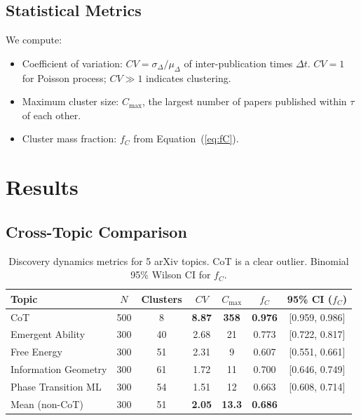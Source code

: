 \documentclass[12pt]{article}
\begin{document}
\subsection{Statistical Metrics}

We compute:
\begin{itemize}
    \item Coefficient of variation: $CV = \sigma_\Delta / \mu_\Delta$ of inter-publication times $\Delta t$. $CV = 1$ for Poisson process; $CV \gg 1$ indicates clustering.
    \item Maximum cluster size: $C_{\max}$, the largest number of papers published within $\tau$ of each other.
    \item Cluster mass fraction: $f_C$ from Equation~(\ref{eq:fC}).
\end{itemize}

\section{Results}

\subsection{Cross-Topic Comparison}

\begin{table}[htbp]
  \centering
  \begin{tabular}{lcccccc}
    \toprule
    Topic & $N$ & Clusters & $CV$ & $C_{\max}$ & $f_C$ & 95\% CI ($f_C$) \\
    \midrule
    CoT & 500 & 8 & \textbf{8.87} & \textbf{358} & \textbf{0.976} & [0.959, 0.986] \\
    Emergent Ability & 300 & 40 & 2.68 & 21 & 0.773 & [0.722, 0.817] \\
    Free Energy & 300 & 51 & 2.31 & 9 & 0.607 & [0.551, 0.661] \\
    Information Geometry & 300 & 61 & 1.72 & 11 & 0.700 & [0.646, 0.749] \\
    Phase Transition ML & 300 & 54 & 1.51 & 12 & 0.663 & [0.608, 0.714] \\
    \midrule
    Mean (non-CoT) & 300 & 51 & \textbf{2.05} & \textbf{13.3} & \textbf{0.686} & \\
    \bottomrule
  \end{tabular}
  \caption{Discovery dynamics metrics for 5 arXiv topics. CoT is a clear outlier. Binomial 95\% Wilson CI for $f_C$.}
  \label{tab:metrics}
\end{table}
\end{document}
